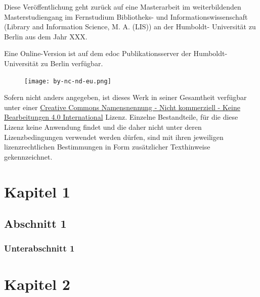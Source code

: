 \documentclass[paper=a4,11pt,twoside,parskip=half-]{scrreprt} %
\begin{document}
Diese Veröffentlichung geht zurück auf eine Masterarbeit im weiterbildenden Ma\-ster\-stu\-di\-en\-gang im Fernstudium Bibliotheks- und Informationswissenschaft (\foreignlanguage{english}{Library and Information Science}, M. A. (LIS)) an der Humboldt- Universität zu Berlin aus dem Jahr XXX.\par
%
%
%
%
Eine Online-Version ist auf dem edoc Publikationsserver der Humboldt-Universität zu Berlin verfügbar. \par

\begin{figure}
\vspace{-.481cm}
\texttt{[image: by-nc-nd-eu.png]}
\end{figure}

\small  Sofern nicht anders angegeben, ist dieses Werk in seiner Gesamtheit verfügbar unter einer \href{https://creativecommons.org/licenses/by-nc-nd/4.0/}{\foreignlanguage{english}{Creative Commons} Namensnennung - Nicht kommerziell - Keine Bearbeitungen 4.0 International} Lizenz. %
Einzelne Bestandteile, für die diese Lizenz keine Anwendung findet und die daher nicht unter deren Lizenzbedingungen verwendet werden dürfen, sind mit ihren jeweiligen lizenzrechtlichen Bestimmungen in Form zusätzlicher Texthinweise gekennzeichnet. 
\newpage
\tableofcontents
\chapter{Kapitel 1}
\blindtext
\section{Abschnitt 1}
\blindtext
\subsection{Unterabschnitt 1}
\chapter{Kapitel 2}
\end{document}
